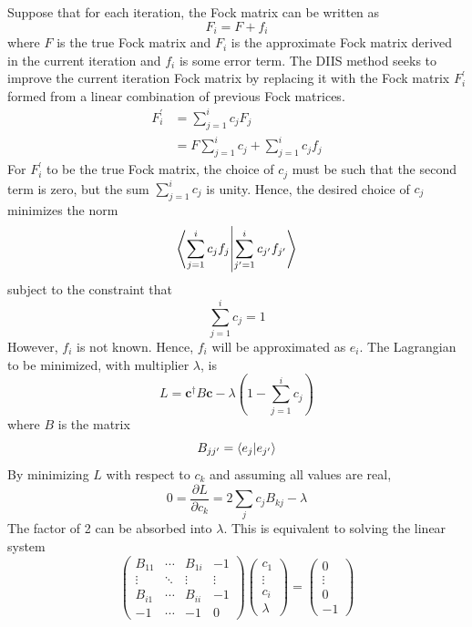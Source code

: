 \documentclass[final,3p,times,twocolumn]{elsarticle}
\begin{document}
Suppose that for each iteration, the Fock matrix can be written as
\begin{equation}
F_i = F + f_i
\end{equation}
where $F$ is the true Fock matrix and $F_i$ is the approximate Fock matrix derived in the current iteration and $f_i$ is some error term. The DIIS method seeks to improve the current iteration Fock matrix by replacing it with the Fock matrix $F_i^\prime$ formed from a linear combination of previous Fock matrices.
\begin{align} \label{eq:diisnewF}
F_i^\prime & = \sum_{j=1}^i c_j F_j \\
& = F \sum_{j=1}^i c_j + \sum_{j=1}^i c_j f_j
\end{align}
For $F_i^\prime$ to be the true Fock matrix, the choice of $c_j$ must be such that the second term is zero, but the sum $\sum_{j=1}^ic_j$ is unity. Hence, the desired choice of $c_j$ minimizes the norm 
\begin{equation}
\bra{\sum_{j=1}^ic_jf_j}\ket{\sum_{j^\prime=1}^ic_{j^\prime}f_{j^\prime}}
\end{equation}
subject to the constraint that
\begin{equation}
\sum_{j=1}^i c_j = 1
\end{equation}
However, $f_i$ is not known. Hence, $f_i$ will be approximated as $e_i$. The Lagrangian to be minimized, with multiplier $\lambda$, is 
\begin{equation}
L = \mathbf{c}^\dagger B \mathbf{c} - \lambda \left(1 - \sum_{j=1}^i c_j\right)
\end{equation}
where $B$ is the matrix
\begin{equation} \label{eq:diisB}
B_{jj^\prime} = \bra{e_j}\ket{e_{j^\prime }}
\end{equation}
By minimizing $L$ with respect to $c_k$ and assuming all values are real,
\begin{equation}
0 = \frac{\partial L}{\partial c_k} = 2 \sum_{j} c_j B_{kj} - \lambda
\end{equation}
The factor of 2 can be absorbed into $\lambda$. This is equivalent to solving the linear system
\begin{equation}\label{eq:diislinsys}
\begin{pmatrix} B_{11} & \cdots & B_{1i} & -1 \\
\vdots & \ddots & \vdots & \vdots \\
B_{i1} & \cdots & B_{ii} & -1 \\
-1 & \cdots & -1 & 0 \end{pmatrix}
\begin{pmatrix} c_1 \\ \vdots \\ c_i \\ \lambda \end{pmatrix} = \begin{pmatrix} 0 \\ \vdots \\ 0 \\ -1 \end{pmatrix}
\end{equation}
\end{document}
